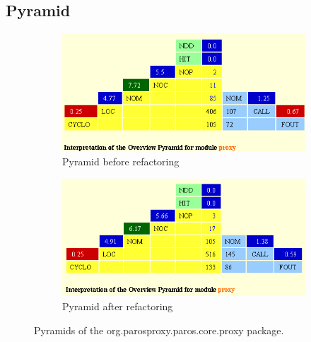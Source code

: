 \subsection{Pyramid}
\begin{figure}[h]
	\begin{subfigure}{0.5\textwidth}
		\centering
		\includegraphics[width=0.9\linewidth]{../Diagrams/pyramidPreRefactoringNoInfo}
		\caption{Pyramid before refactoring}
	\end{subfigure}%
	\begin{subfigure}{0.5\textwidth}
		\centering
		\includegraphics[width=0.9\linewidth]{../Diagrams/pyramidPostRefactoringNoInfo}
		\caption{Pyramid after refactoring}
	\end{subfigure}
	\caption{Pyramids of the org.parosproxy.paros.core.proxy package.}
\end{figure}

